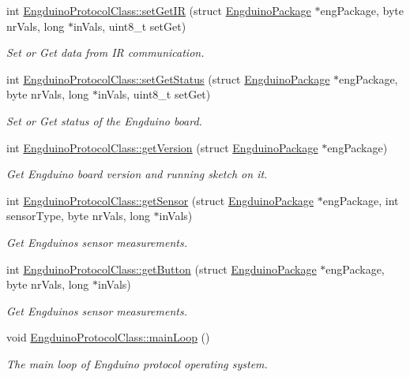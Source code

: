 \begin{DoxyCompactItemize}
int \hyperlink{group___engduino_protocol_ga04358743c2b3e13ff61eb072d57e782a}{Engduino\+Protocol\+Class\+::set\+Get\+I\+R} (struct \hyperlink{struct_engduino_package}{Engduino\+Package} $\ast$eng\+Package, byte nr\+Vals, long $\ast$in\+Vals, uint8\+\_\+t set\+Get)
\begin{DoxyCompactList}\small\item\em Set or Get data from I\+R communication. \end{DoxyCompactList}\item 
int \hyperlink{group___engduino_protocol_gac1faeb0dc90fcacd10ee643c3a45f82f}{Engduino\+Protocol\+Class\+::set\+Get\+Status} (struct \hyperlink{struct_engduino_package}{Engduino\+Package} $\ast$eng\+Package, byte nr\+Vals, long $\ast$in\+Vals, uint8\+\_\+t set\+Get)
\begin{DoxyCompactList}\small\item\em Set or Get status of the Engduino board. \end{DoxyCompactList}\item 
int \hyperlink{group___engduino_protocol_gad585cd4ca7ea413a137fe5783825a612}{Engduino\+Protocol\+Class\+::get\+Version} (struct \hyperlink{struct_engduino_package}{Engduino\+Package} $\ast$eng\+Package)
\begin{DoxyCompactList}\small\item\em Get Engduino board version and running sketch on it. \end{DoxyCompactList}\item 
int \hyperlink{group___engduino_protocol_ga504071d488f9d2a9ace156c4523ea18d}{Engduino\+Protocol\+Class\+::get\+Sensor} (struct \hyperlink{struct_engduino_package}{Engduino\+Package} $\ast$eng\+Package, int sensor\+Type, byte nr\+Vals, long $\ast$in\+Vals)
\begin{DoxyCompactList}\small\item\em Get Engduino\textquotesingle{}s sensor measurements. \end{DoxyCompactList}\item 
int \hyperlink{group___engduino_protocol_gad53e6d5d3c390c3eca7f0456aa7a5d05}{Engduino\+Protocol\+Class\+::get\+Button} (struct \hyperlink{struct_engduino_package}{Engduino\+Package} $\ast$eng\+Package, byte nr\+Vals, long $\ast$in\+Vals)
\begin{DoxyCompactList}\small\item\em Get Engduino\textquotesingle{}s sensor measurements. \end{DoxyCompactList}\item 
void \hyperlink{group___engduino_protocol_ga69274ee75df14c92966878a83248f89e}{Engduino\+Protocol\+Class\+::main\+Loop} ()
\begin{DoxyCompactList}\small\item\em The main loop of Engduino protocol operating system. \end{DoxyCompactList}\end{DoxyCompactItemize}
